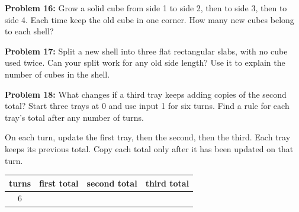 \documentclass[12pt]{article}
\newcommand{\problem}[2]{\textbf{Problem #1:} #2\par}
\newcommand{\answer}[1]{\par\vspace{#1}\par}
\newcommand{\tray}[4]{\draw[rounded corners=3pt] (#1,#2) rectangle ++(1.65,1.15);\node at (#1+.825,#2+.63){\Large #4};\node[font=\small] at (#1+.825,#2-.25){#3};}
\begin{document}
\problem{16}{Grow a solid cube from side 1 to side 2, then to side 3, then to side 4. Each time keep the old cube in one corner. How many new cubes belong to each shell?}
\begin{center}\end{center}
\answer{30mm}
\problem{17}{Split a new shell into three flat rectangular slabs, with no cube used twice. Can your split work for any old side length? Use it to explain the number of cubes in the shell.}
\answer{55mm}

\newpage

\problem{18}{What changes if a third tray keeps adding copies of the second total? Start three trays at 0 and use input 1 for six turns. Find a rule for each tray's total after any number of turns.}

On each turn, update the first tray, then the second, then the third. Each tray keeps its previous total. Copy each total only after it has been updated on that turn.

\begin{center}\end{center}
\answer{15mm}
\begin{center}\renewcommand{\arraystretch}{2}
\begin{tabular}{c|ccc}
turns&first total&second total&third total\\\hline
6&&&
\end{tabular}\end{center}
\end{document}
